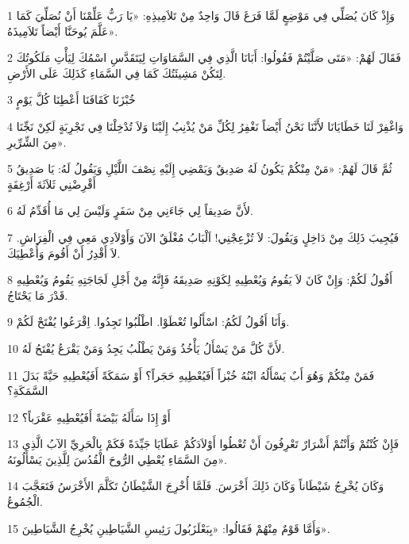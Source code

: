 \par 1 وَإِذْ كَانَ يُصَلِّي فِي مَوْضِعٍ لَمَّا فَرَغَ قَالَ وَاحِدٌ مِنْ تَلاَمِيذِهِ: «يَا رَبُّ عَلِّمْنَا أَنْ نُصَلِّيَ كَمَا عَلَّمَ يُوحَنَّا أَيْضاً تَلاَمِيذَهُ».
\par 2 فَقَالَ لَهُمْ: «مَتَى صَلَّيْتُمْ فَقُولُوا: أَبَانَا الَّذِي فِي السَّمَاوَاتِ لِيَتَقَدَّسِ اسْمُكَ لِيَأْتِ مَلَكُوتُكَ لِتَكُنْ مَشِيئَتُكَ كَمَا فِي السَّمَاءِ كَذَلِكَ عَلَى الأَرْضِ.
\par 3 خُبْزَنَا كَفَافَنَا أَعْطِنَا كُلَّ يَوْمٍ
\par 4 وَاغْفِرْ لَنَا خَطَايَانَا لأَنَّنَا نَحْنُ أَيْضاً نَغْفِرُ لِكُلِّ مَنْ يُذْنِبُ إِلَيْنَا وَلاَ تُدْخِلْنَا فِي تَجْرِبَةٍ لَكِنْ نَجِّنَا مِنَ الشِّرِّيرِ».
\par 5 ثُمَّ قَالَ لَهُمْ: «مَنْ مِنْكُمْ يَكُونُ لَهُ صَدِيقٌ وَيَمْضِي إِلَيْهِ نِصْفَ اللَّيْلِ وَيَقُولُ لَهُ: يَا صَدِيقُ أَقْرِضْنِي ثَلاَثَةَ أَرْغِفَةٍ
\par 6 لأَنَّ صَدِيقاً لِي جَاءَنِي مِنْ سَفَرٍ وَلَيْسَ لِي مَا أُقَدِّمُ لَهُ.
\par 7 فَيُجِيبَ ذَلِكَ مِنْ دَاخِلٍ وَيَقُولَ: لاَ تُزْعِجْنِي! اَلْبَابُ مُغْلَقٌ الآنَ وَأَوْلاَدِي مَعِي فِي الْفِرَاشِ. لاَ أَقْدِرُ أَنْ أَقُومَ وَأُعْطِيَكَ.
\par 8 أَقُولُ لَكُمْ: وَإِنْ كَانَ لاَ يَقُومُ وَيُعْطِيهِ لِكَوْنِهِ صَدِيقَهُ فَإِنَّهُ مِنْ أَجْلِ لَجَاجَتِهِ يَقُومُ وَيُعْطِيهِ قَدْرَ مَا يَحْتَاجُ.
\par 9 وَأَنَا أَقُولُ لَكُمُ: اسْأَلُوا تُعْطَوْا. اطْلُبُوا تَجِدُوا. اِقْرَعُوا يُفْتَحْ لَكُمْ.
\par 10 لأَنَّ كُلَّ مَنْ يَسْأَلُ يَأْخُذُ وَمَنْ يَطْلُبُ يَجِدُ وَمَنْ يَقْرَعُ يُفْتَحُ لَهُ.
\par 11 فَمَنْ مِنْكُمْ وَهُوَ أَبٌ يَسْأَلُهُ ابْنُهُ خُبْزاً أَفَيُعْطِيهِ حَجَراً؟ أَوْ سَمَكَةً أَفَيُعْطِيهِ حَيَّةً بَدَلَ السَّمَكَةِ؟
\par 12 أَوْ إِذَا سَأَلَهُ بَيْضَةً أَفَيُعْطِيهِ عَقْرَباً؟
\par 13 فَإِنْ كُنْتُمْ وَأَنْتُمْ أَشْرَارٌ تَعْرِفُونَ أَنْ تُعْطُوا أَوْلاَدَكُمْ عَطَايَا جَيِّدَةً فَكَمْ بِالْحَرِيِّ الآبُ الَّذِي مِنَ السَّمَاءِ يُعْطِي الرُّوحَ الْقُدُسَ لِلَّذِينَ يَسْأَلُونَهُ».
\par 14 وَكَانَ يُخْرِجُ شَيْطَاناً وَكَانَ ذَلِكَ أَخْرَسَ. فَلَمَّا أُخْرِجَ الشَّيْطَانُ تَكَلَّمَ الأَخْرَسُ فَتَعَجَّبَ الْجُمُوعُ.
\par 15 وَأَمَّا قَوْمٌ مِنْهُمْ فَقَالُوا: «بِبَعْلَزَبُولَ رَئِيسِ الشَّيَاطِينِ يُخْرِجُ الشَّيَاطِينَ».
